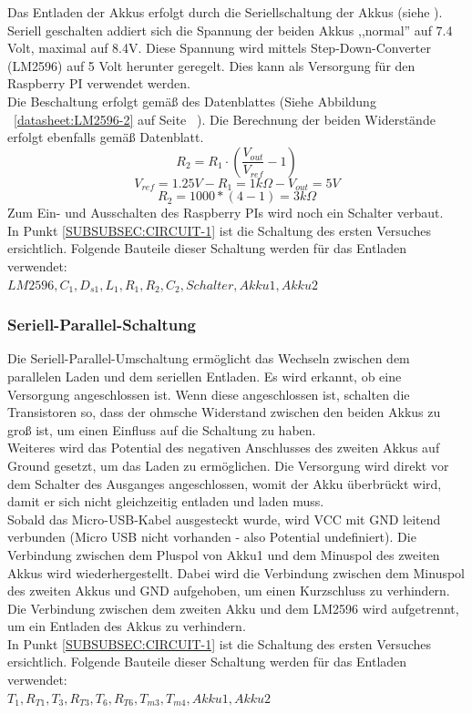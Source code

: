 \documentclass[12pt,a4paper]{article}
\begin{document}
Das Entladen der Akkus erfolgt durch die Seriellschaltung der Akkus (siehe ). Seriell geschalten addiert sich die Spannung der beiden Akkus ,,normal'' auf 7.4 Volt, maximal auf 8.4V. Diese Spannung wird mittels Step-Down-Converter (LM2596) auf 5 Volt herunter geregelt.  Dies kann als Versorgung für den Raspberry PI verwendet werden. \\
Die Beschaltung erfolgt gemäß des Datenblattes (Siehe Abbildung ~\ref{datasheet:LM2596-2} auf Seite ~\pageref{datasheet:LM2596-2}). Die Berechnung der beiden Widerstände erfolgt ebenfalls gemäß Datenblatt.
\[R_2 = R_1 \cdot \left(\frac{V_{out}}{V_{ref}} - 1 \right)\]
\[V_{ref} = 1.25 V - R_1 = 1 k\Omega - V_{out} = 5V\]
\[R_2 = 1000*(4-1) = 3 k\Omega\]
Zum Ein- und Ausschalten des Raspberry PIs wird noch ein Schalter verbaut. \\
In Punkt \ref{SUBSUBSEC:CIRCUIT-1} ist die Schaltung des ersten Versuches ersichtlich. Folgende Bauteile dieser Schaltung werden für das Entladen verwendet:\\ $LM2596,C_1,D_{s1},L_1,R_1,R_2,C_2,Schalter,Akku1, Akku2$ \\

\subsubsection{Seriell-Parallel-Schaltung}
\label{SUBSUBSEC:SERPAR}

Die Seriell-Parallel-Umschaltung ermöglicht das Wechseln zwischen dem parallelen Laden und dem seriellen Entladen. Es wird erkannt, ob eine Versorgung angeschlossen ist. Wenn diese angeschlossen ist, schalten die Transistoren so, dass der ohmsche Widerstand zwischen den beiden Akkus zu groß ist, um einen Einfluss auf die Schaltung zu haben.\\
Weiteres wird das Potential des negativen Anschlusses des zweiten Akkus auf Ground gesetzt, um das Laden zu ermöglichen. Die Versorgung wird direkt vor dem Schalter des Ausganges angeschlossen, womit der Akku überbrückt wird, damit er sich nicht gleichzeitig entladen und laden muss. \\[2ex] 
Sobald das Micro-USB-Kabel ausgesteckt wurde, wird VCC mit GND leitend verbunden (Micro USB nicht vorhanden - also Potential undefiniert). Die Verbindung zwischen dem Pluspol von Akku1 und dem Minuspol des zweiten Akkus wird wiederhergestellt. Dabei wird die Verbindung zwischen dem Minuspol des zweiten Akkus und GND aufgehoben, um einen Kurzschluss zu verhindern.  \\
Die Verbindung zwischen dem zweiten Akku und dem LM2596 wird aufgetrennt, um ein Entladen des Akkus zu verhindern. \\
In Punkt \ref{SUBSUBSEC:CIRCUIT-1} ist die Schaltung des ersten Versuches ersichtlich. Folgende Bauteile dieser Schaltung werden für das Entladen verwendet:\\ $T_1,R_{T1},T_3,R_{T3},T_6,R_{T6},T_{m3},T_{m4}, Akku1, Akku2$ \\
\end{document}
